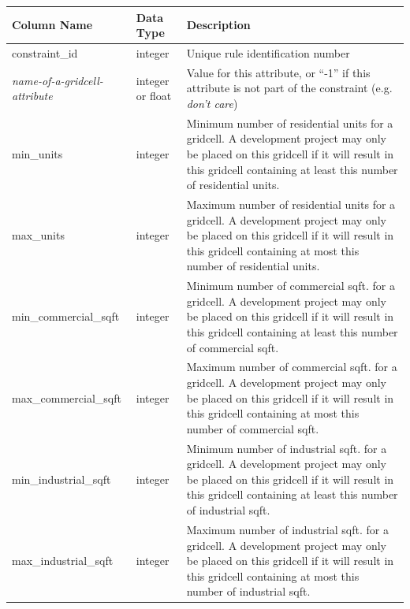 \begin{tabular}{|l|l|p{3.5in}|}

\hline
\textbf{Column Name} & \textbf{Data Type} & \textbf{Description} \\

\hline constraint_id & integer & Unique rule identification number  \\

\hline \emph{name-of-a-gridcell-attribute} & integer or float &  Value for this
attribute, or ``-1'' if this attribute is not part of the constraint (e.g.
\emph{don't care}) \\

\hline min_units & integer & Minimum number of residential units for a gridcell.
A development project may only be placed on this gridcell if it will result in
this gridcell containing at least this number of residential units. \\

\hline max_units & integer & Maximum number of residential units for a gridcell.
A development project may only be placed on this gridcell if it will result in
this gridcell containing at most this number of residential units. \\

\hline min_commercial_sqft & integer & Minimum number of commercial
sqft. for a gridcell.  A development project may only be placed on
this gridcell if it will
result in this gridcell containing at least this number of commercial sqft. \\

\hline max_commercial_sqft & integer & Maximum number of commercial
sqft. for a gridcell. A development project may only be placed on
this gridcell if it will
result in this gridcell containing at most this number of commercial sqft. \\

\hline min_industrial_sqft & integer & Minimum number of industrial
sqft. for a gridcell.  A development project may only be placed on
this gridcell if it will
result in this gridcell containing at least this number of industrial sqft. \\

\hline max_industrial_sqft & integer & Maximum number of industrial
sqft. for a gridcell. A development project may only be placed on
this gridcell if it will
result in this gridcell containing at most this number of industrial sqft. \\

\hline
\end{tabular}


